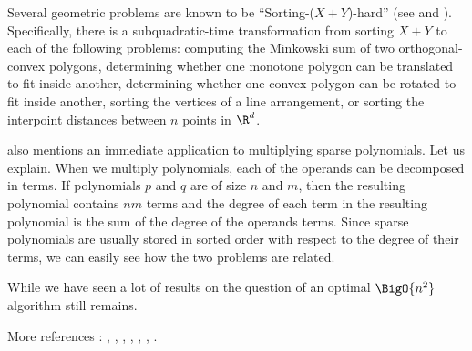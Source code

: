 Several geometric problems are known to be ``Sorting-($X + Y$)-hard'' (see
\cite{barrera1996finding} and \cite{barequet2001polygon}). Specifically, there
is a subquadratic-time transformation from sorting $X + Y$ to each of the
following problems: computing the Minkowski sum of two orthogonal-convex
polygons, determining whether one monotone polygon can be translated to fit
inside another, determining whether one convex polygon can be rotated to fit
inside another, sorting the vertices of a line arrangement, or sorting the
interpoint distances between $n$ points in $\R^d$.

\citet{fredman:1976} also mentions an immediate application to multiplying sparse
polynomials. Let us explain. When we multiply
polynomials, each of the operands can be decomposed in terms. If polynomials
$p$ and $q$ are of size $n$ and $m$, then the resulting polynomial contains
$nm$ terms and the degree of each term in the resulting polynomial is the sum
of the degree of the operands terms. Since sparse polynomials are usually
stored in sorted order with respect to the degree of their terms, we can easily
see how the two problems are related.

While we have seen a lot of results on  the question of an
optimal $\BigO{n^2}$ algorithm still remains.

More references : \cite{orourke:2012:sortxy}, \cite{kahn:1995},
\cite{dietzfelbinger1989lower}, \cite{steiger1995pseudo},
\cite{lambert:1990}, \cite{erickson:1999},
\cite{bremner2012necklaces}.



